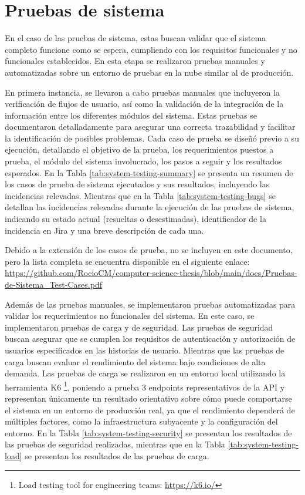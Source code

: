 \section{Pruebas de sistema}

En el caso de las pruebas de sistema, estas buscan validar que el sistema completo funcione como se espera, cumpliendo con los requisitos funcionales y no funcionales establecidos. En esta etapa se realizaron pruebas manuales y automatizadas sobre un entorno de pruebas en la nube similar al de producción.

En primera instancia, se llevaron a cabo pruebas manuales que incluyeron la verificación de flujos de usuario, así como la validación de la integración de la información entre los diferentes módulos del sistema. Estas pruebas se documentaron detalladamente para asegurar una correcta \gls{trazabilidad} y facilitar la identificación de posibles problemas. Cada caso de prueba se diseñó previo a su ejecución, detallando el objetivo de la prueba, los requerimientos puestos a prueba, el módulo del sistema involucrado, los pasos a seguir y los resultados esperados. En la Tabla \ref{tab:system-testing-summary} se presenta un resumen de los casos de prueba de sistema ejecutados y sus resultados, incluyendo las incidencias relevadas. Mientras que en la Tabla \ref{tab:system-testing-bugs} se detallan las incidencias relevadas durante la ejecución de las pruebas de sistema, indicando su estado actual (resueltas o desestimadas), identificador de la incidencia en Jira y una breve descripción de cada una.

Debido a la extensión de los casos de prueba, no se incluyen en este documento, pero la lista completa se encuentra disponible en el siguiente enlace: \url{https://github.com/RocioCM/computer-science-thesis/blob/main/docs/Pruebas-de-Sistema_Test-Cases.pdf}

Además de las pruebas manuales, se implementaron pruebas automatizadas para validar los requerimientos no funcionales del sistema. En este caso, se implementaron pruebas de carga y de seguridad. Las pruebas de seguridad buscan asegurar que se cumplen los requisitos de autenticación y autorización de usuarios especificados en las historias de usuario. Mientras que las pruebas de carga buscan evaluar el rendimiento del sistema bajo condiciones de alta demanda. Las pruebas de carga se realizaron en un entorno local utilizando la herramienta K6 \footnote{Load testing tool for engineering teams: \url{https://k6.io/}}, poniendo a prueba 3 endpoints representativos de la API y representan únicamente un resultado orientativo sobre cómo puede comportarse el sistema en un entorno de producción real, ya que el rendimiento dependerá de múltiples factores, como la infraestructura subyacente y la configuración del entorno. En la Tabla \ref{tab:system-testing-security} se presentan los resultados de las pruebas de seguridad realizadas, mientras que en la Tabla \ref{tab:system-testing-load} se presentan los resultados de las pruebas de carga.

